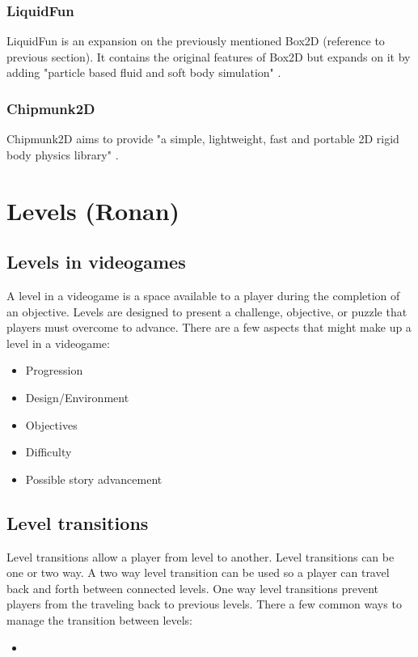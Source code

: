 \documentclass{article} %
\begin{document}
\subsubsection{LiquidFun}

LiquidFun is an expansion on the previously mentioned Box2D (reference to previous section). It contains the original features of Box2D but expands on it by adding "particle based fluid and soft body simulation" \cite{Miles_2014}.

\subsubsection{Chipmunk2D}

Chipmunk2D aims to provide "a simple, lightweight, fast and portable 2D rigid body physics library" \cite{Slembcke_2023}.

\newpage

\section{Levels (Ronan)}
\subsection{Levels in videogames}
A level in a videogame is a space available to a player during 
the completion of an objective. Levels are designed to present a challenge, 
objective, or puzzle that players must overcome to advance. 
There are a few aspects that might make up a level in a videogame:
\begin{itemize}
	\item Progression
	\item Design/Environment
	\item Objectives
	\item Difficulty
	\item Possible story advancement
\end{itemize}

\subsection{Level transitions}
Level transitions allow a player from level to another.
Level transitions can be one or two way.
A two way level transition can be used so a player can travel back and forth between connected levels.
One way level transitions prevent players from the traveling back to previous levels.
There a few common ways to manage the transition between levels:
\begin {itemize}
	\item
\end{itemize}
\end{document}
